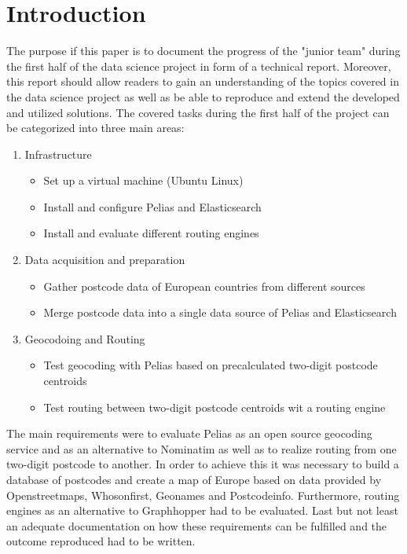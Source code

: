 
\section{Introduction}
The purpose if this paper is to document the progress of the "junior team" during the first half of the data science project in form of a technical report. Moreover, this report should allow readers to gain an understanding of the topics covered in the data science project as well as be able to reproduce and extend the developed and utilized solutions.
The covered tasks during the first half of the project can be categorized into three main areas:
\begin{enumerate}
\item Infrastructure
\begin{itemize}
\item Set up a virtual machine (Ubuntu Linux)
\item Install and configure Pelias and Elasticsearch
\item Install and evaluate different routing engines
\end{itemize}
\item Data acquisition and preparation
\begin{itemize}
\item Gather postcode data of European countries from different sources
\item Merge postcode data into a single data source of Pelias and Elasticsearch
\end{itemize}
\item Geocodoing and Routing
\begin{itemize}
\item Test geocoding with Pelias based on precalculated two-digit postcode centroids
\item Test routing between two-digit postcode centroids wit a routing engine
\end{itemize}
\end{enumerate}
The main requirements were to evaluate Pelias as an open source geocoding service and as an alternative to Nominatim as well as to realize routing from one two-digit postcode to another. In order to achieve this it was necessary to build a database of postcodes and create a map of Europe based on data provided by Openstreetmaps, Whosonfirst, Geonames and Postcodeinfo. Furthermore, routing engines as an alternative to Graphhopper had to be evaluated. Last but not least an adequate documentation on how these requirements can be fulfilled and the outcome reproduced had to be written.